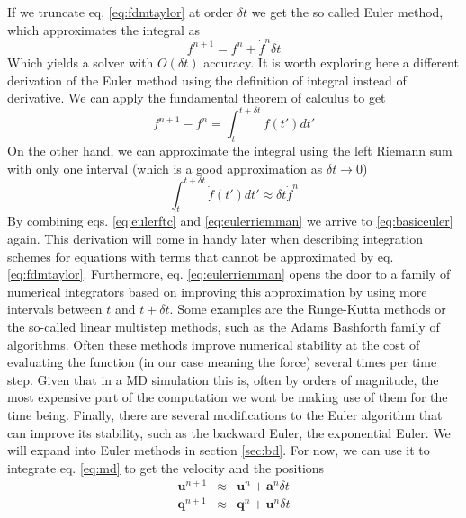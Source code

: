 \documentclass[ twoside,openright,titlepage,numbers=noenddot,%
headinclude,footinclude,cleardoublepage=empty,abstract=on,
BCOR=5mm,paper=a4,fontsize=11pt, dvipsnames
]{scrreprt}
\renewcommand{\vec}[1]{\bm{#1}}
\newcommand{\dt}{\delta t}
\newcommand{\ppos}{q}
\newcommand{\pvel}{u}
\begin{document}
If we truncate eq. \eqref{eq:fdmtaylor} at order $\dt$ we get the so called Euler method\cite{euler}, which approximates the integral as
\begin{equation}
  \label{eq:basiceuler}
  f^{n+1} = f^n + \dot{f}^n\dt
\end{equation}
Which yields a solver with $O(\dt)$ accuracy\cite{euleraccuracy}.
It is worth exploring here a different derivation of the Euler method using the definition of integral instead of derivative. We can apply the fundamental theorem of calculus to get
\begin{equation}
  \label{eq:eulerftc}
  f^{n+1} - f^n = \int_t^{t+\dt}\dot{f}(t')dt'
\end{equation}
On the other hand, we can approximate the integral using the left Riemann sum with only one interval (which is a good approximation as $\dt\rightarrow 0$)
\begin{equation}
  \label{eq:eulerriemman}
  \int_t^{t+\dt}\dot{f}(t')dt' \approx \dt \dot{f}^n
\end{equation}
By combining eqs. \eqref{eq:eulerftc} and \eqref{eq:eulerriemman} we arrive to \eqref{eq:basiceuler} again.
This derivation will come in handy later when describing integration schemes for equations with terms that cannot be approximated by eq. \eqref{eq:fdmtaylor}.
Furthermore, eq. \eqref{eq:eulerriemman} opens the door to a family of numerical integrators based on improving this approximation by using more intervals between $t$ and $t+\dt$. Some examples are the Runge-Kutta methods\cite{rk4} or the so-called linear multistep methods, such as the Adams Bashforth\cite{adamsbashforth} family of algorithms.
Often these methods improve numerical stability at the cost of evaluating the function (in our case meaning the force) several times per time step. Given that in a \gls{MD} simulation this is, often by orders of magnitude, the most expensive part of the computation we wont be making use of them for the time being.
Finally, there are several modifications to the Euler algorithm that can improve its stability, such as the backward Euler\cite{backwardeuler}, the exponential Euler\cite{exponentialEuler}.
We will expand into Euler methods in section \ref{sec:bd}.
For now, we can use it to integrate eq. \eqref{eq:md} to get the velocity and the positions
\begin{equation}
  \label{eq:basiceulermd}
  \begin{aligned}
  \vec{\pvel}^{n+1} &\approx& \vec{\pvel}^n + \vec{a}^n\dt\\
  \vec{\ppos}^{n+1} &\approx& \vec{\ppos}^n + \vec{\pvel}^n\dt
\end{aligned}
\end{equation}
\end{document}
